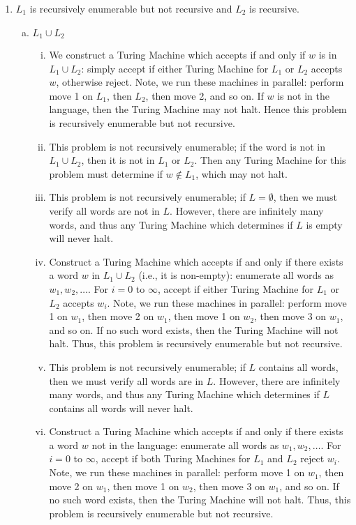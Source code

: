 \begin{enumerate}[1.]
    \item \(L_1\) is recursively enumerable but not recursive and \(L_2\) is recursive.
    \begin{enumerate}[a.]
        \item \(L_1 \cup L_2\)
        \begin{enumerate}[i.]
            \item We construct a Turing Machine which accepts if and only if \(w\) is in \(L_1 \cup L_2\): simply accept if either Turing Machine for \(L_1\) or \(L_2\) accepts \(w\), otherwise reject. Note, we run these machines in parallel: perform move 1 on \(L_1\), then \(L_2\), then move 2, and so on.  If \(w\) is not in the language, then the Turing Machine may not halt. Hence this problem is recursively enumerable but not recursive. 
            \item This problem is not recursively enumerable; if the word is not in \(L_1 \cup L_2\), then it is not in \(L_1\) or \(L_2\). Then any Turing Machine for this problem must determine if \(w\not\in L_1\), which may not halt. 
            \item This problem is not recursively enumerable; if \(L = \emptyset \), then we must verify all words are not in \(L\). However, there are infinitely many words, and thus any Turing Machine which determines if \(L\) is empty will never halt. 
            \item Construct a Turing Machine which accepts if and only if there exists a word \(w\) in \(L_1 \cup L_2\) (i.e., it is non-empty): enumerate all words as \(w_1, w_2, \hdots \). For \(i=0\) to \(\infty \), accept if either Turing Machine for \(L_1\) or \(L_2\) accepts \(w_i\). Note, we run these machines in parallel: perform move 1 on \(w_1\), then move 2 on \(w_1\), then move 1 on \(w_2\), then move 3 on \(w_1\), and so on. If no such word exists, then the Turing Machine will not halt. Thus, this problem is recursively enumerable but not recursive.
            \item This problem is not recursively enumerable; if \(L\) contains all words, then we must verify all words are in \(L\). However, there are infinitely many words, and thus any Turing Machine which determines if \(L\) contains all words will never halt. 
            \item Construct a Turing Machine which accepts if and only if there exists a word \(w\) not in the language: enumerate all words as \(w_1, w_2, \hdots \). For \(i=0\) to \(\infty \), accept if both Turing Machines for \(L_1\) and \(L_2\) reject \(w_i\). Note, we run these machines in parallel: perform move 1 on \(w_1\), then move 2 on \(w_1\), then move 1 on \(w_2\), then move 3 on \(w_1\), and so on. If no such word exists, then the Turing Machine will not halt. Thus, this problem is recursively enumerable but not recursive.

\end{enumerate}
\end{enumerate}
\end{enumerate}
